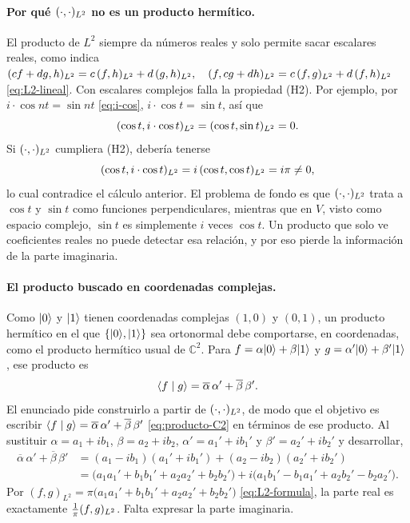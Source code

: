 \paragraph{Por qué $(\cdot,\cdot)_{L^2}$ no es un producto hermítico.}
El producto de $L^2$ siempre da números reales y solo permite sacar escalares reales, como
indica $(cf+dg,h)_{L^2}=c\,(f,h)_{L^2}+d\,(g,h)_{L^2},\quad\penalty0 (f,cg+dh)_{L^2}=c\,(f,g)_{L^2}+d\,(f,h)_{L^2}$ \eqref{eq:L2-lineal}. Con escalares complejos falla la propiedad (H2). Por ejemplo, por
$i\cdot\cos nt=\sin nt$ \eqref{eq:i-cos}, $i\cdot\cos t=\sin t$, así que
\[
  (\cos t,i\cdot\cos t)_{L^2}=(\cos t,\sin t)_{L^2}=0 .
\]
Si $(\cdot,\cdot)_{L^2}$ cumpliera (H2), debería tenerse
\[
  (\cos t,i\cdot\cos t)_{L^2}=i\,(\cos t,\cos t)_{L^2}=i\pi\ne 0 ,
\]
lo cual contradice el cálculo anterior. El problema de fondo es que $(\cdot,\cdot)_{L^2}$ trata a
$\cos t$ y $\sin t$ como funciones perpendiculares, mientras que en $V$, visto como espacio
complejo, $\sin t$ es simplemente $i$ veces $\cos t$. Un producto que solo ve coeficientes
reales no puede detectar esa relación, y por eso pierde la información de la parte imaginaria.

\paragraph{El producto buscado en coordenadas complejas.}
Como $\lvert 0\rangle$ y $\lvert 1\rangle$ tienen coordenadas complejas $(1,0)$ y $(0,1)$, un producto hermítico en
el que $\{\lvert 0\rangle,\lvert 1\rangle\}$ sea ortonormal debe comportarse, en coordenadas, como el producto
hermítico usual de $\mathbb C^2$. Para $f=\alpha\lvert 0\rangle+\beta\lvert 1\rangle$ y
$g=\alpha'\lvert 0\rangle+\beta'\lvert 1\rangle$, ese producto es
\begin{equation}\label{eq:producto-C2}
  \langle f\mid g\rangle=\overline\alpha\,\alpha'+\overline\beta\,\beta' .
\end{equation}
El enunciado pide construirlo a partir de $(\cdot,\cdot)_{L^2}$, de modo que el objetivo es
escribir $\langle f\mid g\rangle=\overline\alpha\,\alpha'+\overline\beta\,\beta'$ \eqref{eq:producto-C2} en términos de ese producto. Al sustituir
$\alpha=a_1+ib_1$, $\beta=a_2+ib_2$, $\alpha'=a_1'+ib_1'$ y $\beta'=a_2'+ib_2'$ y desarrollar,
\[
\begin{aligned}
\overline\alpha\,\alpha'+\overline\beta\,\beta'
&=(a_1-ib_1)(a_1'+ib_1')+(a_2-ib_2)(a_2'+ib_2')\\
&=\bigl(a_1a_1'+b_1b_1'+a_2a_2'+b_2b_2'\bigr)
 +i\bigl(a_1b_1'-b_1a_1'+a_2b_2'-b_2a_2'\bigr).
\end{aligned}
\]
Por $(f,g)_{L^2}=\pi\bigl(a_1a_1'+b_1b_1'+a_2a_2'+b_2b_2'\bigr)$ \eqref{eq:L2-formula}, la parte real es exactamente $\frac1\pi(f,g)_{L^2}$. Falta expresar la
parte imaginaria.

